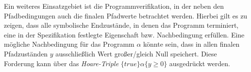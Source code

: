 Ein weiteres Einsatzgebiet ist die Programmverifikation, in der neben den Pfadbedingungen auch die finalen Pfadwerte betrachtet werden. Hierbei gilt es zu zeigen, dass alle symbolische Endzustände, in denen das Programm terminiert, eine in der Spezifikation festlegte Eigenschaft bzw. Nachbedingung erfüllen. Eine mögliche Nachbedingung für das Programm $\alpha$ könnte sein, dass in allen finalen Pfadzuständen $y$ ausschließlich Wert großer/gleich Null speichert. Diese Forderung kann über das \emph{Hoare-Triple} $\{true\}\alpha\{y \geq 0\}$ ausgedrückt werden.